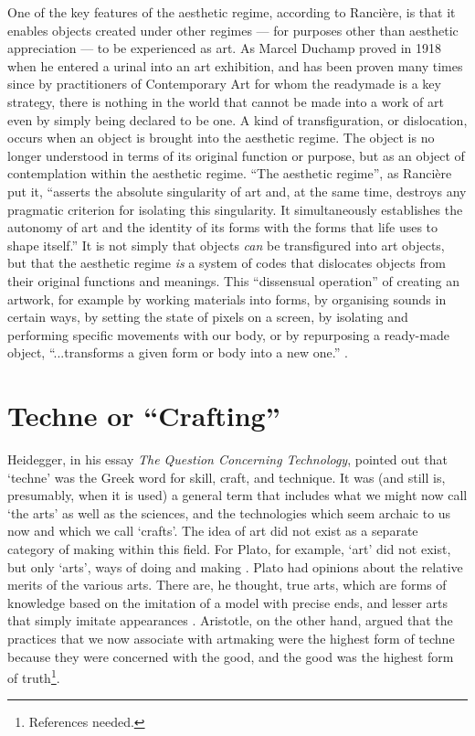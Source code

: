 \documentclass[letterpaper]{article}
\begin{document}
    One of the key features of the aesthetic regime, according to Rancière, is that it enables objects created under other regimes — for purposes other than aesthetic appreciation — to be experienced as art. As Marcel Duchamp proved in 1918 when he entered a urinal into an art exhibition, and has been proven many times since by practitioners of Contemporary Art for whom the readymade is a key strategy, there is nothing in the world that cannot be made into a work of art even by simply being declared to be one. A kind of transfiguration, or dislocation, occurs when an object is brought into the aesthetic regime. The object is no longer understood in terms of its original function or purpose, but as an object of contemplation within the aesthetic regime. “The aesthetic regime”, as Rancière put it, “asserts the absolute singularity of art and, at the same time, destroys any pragmatic criterion for isolating this singularity. It simultaneously establishes the autonomy of art and the identity of its forms with the forms that life uses to shape itself.” It is not simply that objects \emph{can} be transfigured into art objects, but that the aesthetic regime \emph{is} a system of codes that dislocates objects from their original functions and meanings. This “dissensual operation” of creating an artwork, for example by working materials into forms, by organising sounds in certain ways, by setting the state of pixels on a screen, by isolating and performing specific movements with our body, or by repurposing a ready-made object, “...transforms a given form or body into a new one.” \citep[p.54]{RancierThEmncptdSpcttr2009}.

\section{Techne or “Crafting”}

    Heidegger, in his essay \emph{The Question Concerning Technology}, pointed out that ‘techne’ was the Greek word for skill, craft, and technique. It was (and still is, presumably, when it is used) a general term that includes what we might now call ‘the arts’ as well as the sciences, and the technologies which seem archaic to us now and which we call ‘crafts’. The idea of art did not exist as a separate category of making within this field. For Plato, for example, ‘art’ did not exist, but only ‘arts’, ways of doing and making \citep[p.20]{RancierPltcsOfThAsthtcs2004}. Plato had opinions about the relative merits of the various arts. There are, he thought, true arts, which are forms of knowledge based on the imitation of a model with precise ends, and lesser arts that simply imitate appearances \citep[p.20]{RancierPltcsOfThAsthtcs2004}. Aristotle, on the other hand, argued that the practices that we now associate with artmaking were the highest form of techne because they were concerned with the good, and the good was the highest form of truth\footnote{References needed.}.
\end{document}
